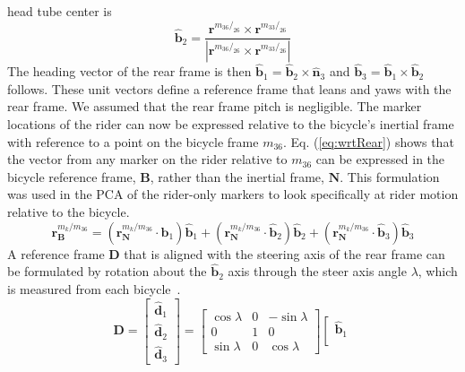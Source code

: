 \documentclass[smallextended]{svjour3}     %
\begin{document}
\begin{appendices}
head tube center is
\begin{equation}
\hat{\mathbf{b}}_2=
\frac{\mathbf{r}^{{m_{36}}/_{26}}\times\mathbf{r}^{{m_{33}}/_{26}}}
{|\mathbf{r}^{{m_{36}}/_{26}}\times\mathbf{r}^{{m_{33}}/_{26}}|}
\label{eq:b2}
\end{equation}
The heading vector of the rear frame is then
$\hat{\mathbf{b}}_1=\hat{\mathbf{b}}_2\times\hat{\mathbf{n}}_3$ and
$\hat{\mathbf{b}}_3=\hat{\mathbf{b}}_1\times\hat{\mathbf{b}}_2$ follows. These
unit vectors define a reference frame that leans and yaws with the rear frame.
We assumed that the rear frame pitch is negligible. The marker locations of the
rider can now be expressed relative to the bicycle's inertial frame with reference to a point
on the bicycle frame $m_{36}$. Eq. (\ref{eq:wrtRear}) shows that the vector from
any marker on the rider relative to $m_{36}$ can be expressed in the bicycle
reference frame, $\mathbf{B}$, rather than the inertial frame, $\mathbf{N}$.
This formulation was used in the
PCA of the rider-only markers to look specifically at rider motion relative to
the bicycle.
\begin{equation}
    \mathbf{r}^{{m_{k}}/m_{36}}_\mathbf{B}=
    (\mathbf{r}^{{m_{k}}/m_{36}}_\mathbf{N}\cdot\hat{\mathbf{b}}_1)\hat{\mathbf{b}}_1+
    (\mathbf{r}^{{m_{k}}/m_{36}}_\mathbf{N}\cdot\hat{\mathbf{b}}_2)\hat{\mathbf{b}}_2+
    (\mathbf{r}^{{m_{k}}/m_{36}}_\mathbf{N}\cdot\hat{\mathbf{b}}_3)\hat{\mathbf{b}}_3
\label{eq:wrtRear}
\end{equation}
A reference frame $\mathbf{D}$ that is aligned with the steering axis of the
rear frame can be formulated by rotation about the $\hat{\mathbf{b}}_2$ axis
through the steer axis angle $\lambda$, which is measured from each
bicycle~\cite{Moore2009a}.
\begin{equation}
    \mathbf{D}=
    \left[
    \begin{array}{c}
    \hat{\mathbf{d}}_1\\
    \hat{\mathbf{d}}_2\\
    \hat{\mathbf{d}}_3
  \end{array}
    \right]
    =
    \left[
    \begin{array}{rrr}
    \cos{\lambda} &  0 &  -\sin{\lambda}\\
    0             &  1 &  0\\
    \sin{\lambda} &  0 & \cos{\lambda}
    \end{array}
    \right]
    \left[
    \begin{array}{c}
    \hat{\mathbf{b}}_1\\

\end{array}
\end{equation}
\end{appendices}
\end{document}
